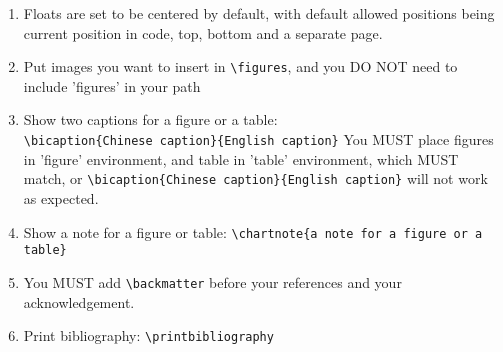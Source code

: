 \documentclass{bjfuthesis}
\begin{document}
\begin{enumerate}
\begin{verbatim}
\section{section 1.2 title}
\subsection{subsection 1.2.1 title}
normal text
...
\end{verbatim}
\item Floats are set to be centered by default, with default allowed positions being current position in code, top, bottom and a separate page.
\item Put images you want to insert in \verb|\figures|, and you DO NOT need to include 'figures' in your path
\item Show two captions for a figure or a table:\\ \verb|\bicaption{Chinese caption}{English caption}|
You MUST place figures in 'figure' environment, and table in 'table' environment, which MUST match, 
or \verb|\bicaption{Chinese caption}{English caption}| will not work as expected.
\item Show a note for a figure or table: \verb|\chartnote{a note for a figure or a table}|
\item You MUST add \verb|\backmatter| before your references and your acknowledgement.
\item Print bibliography: \verb|\printbibliography|
\end{enumerate}
\end{document}
